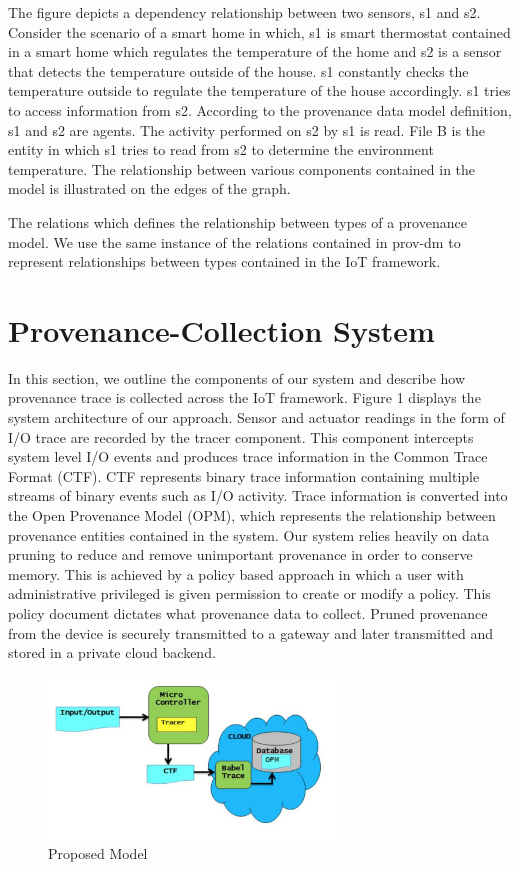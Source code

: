 The figure depicts a dependency relationship between two sensors, s1 and s2. Consider the scenario of a smart home in which, s1 is smart thermostat contained in a smart home which regulates the temperature of the home and s2 is a sensor that detects the temperature outside of the house. s1 constantly checks the temperature outside to regulate the temperature of the house accordingly. s1 tries to access information from s2.  According to the provenance data model  definition, s1 and s2 are agents. The activity performed on s2 by s1 is read. File B is the entity in which s1 tries to read from s2 to determine the environment temperature. The relationship between various components contained in the model is illustrated on the edges of the graph.

\par The relations which defines the relationship between types of a provenance model.  We use the same instance of the relations contained in prov-dm to represent relationships between types contained in the IoT framework.


\section{Provenance-Collection System}

In this section, we outline the components of our system and describe how provenance trace is collected across the IoT framework. Figure 1 displays the system architecture of our approach. Sensor and actuator readings in the form of I/O trace are recorded by the tracer component. This component intercepts system level I/O events and produces trace information in the Common Trace Format (CTF). CTF represents binary trace information containing multiple streams of binary events such as I/O activity. Trace information is converted into the Open Provenance Model (OPM), which represents the relationship between provenance entities contained in the system. Our system relies heavily on data pruning to reduce and remove unimportant provenance in order to conserve memory. This is achieved by a policy based approach in which a user with administrative privileged is given permission to create or modify a policy. This policy document dictates what provenance data to collect. Pruned provenance from the device is securely transmitted to a gateway and later transmitted and stored in a private cloud backend.

\begin{figure}[h]
\begin{center}

\includegraphics[width =3.0in]{architecture.PNG}    
\end{center}
\caption{Proposed Model}
\label{autom}
\end{figure}

